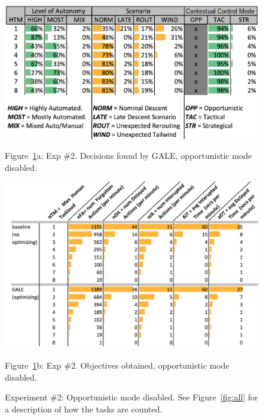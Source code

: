 \documentclass[journal]{IEEEtran}
\newcommand{\fig}[1]{Figure~\ref{fig:#1}}
\begin{document}
\begin{figure}
\begin{center}
\includegraphics[width=4.5in]{figures/GALE,decisions,noOpp}

 \fig{some}a:  Exp \#2. Decisions found by GALE, opportunistic mode disabled.




\includegraphics[width=5.25in]{figures/objectives,NoOpp}

\fig{some}b:  Exp \#2. Objectives obtained, opportunistic mode disabled.
\end{center}

\caption{Experiment \#2: Opportunistic mode disabled. 
See \fig{all} for a description of how the tasks are counted.}\label{fig:some}
\end{figure}


\end{document}
